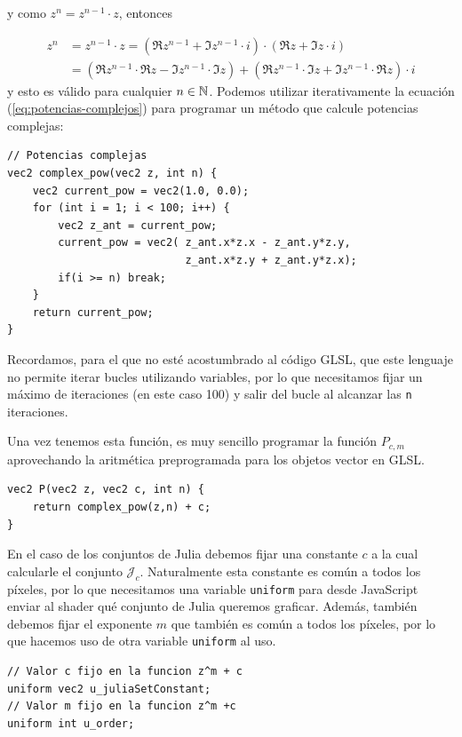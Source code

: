 y como $z^n = z^{n-1}\cdot z$, entonces

\begin{equation}
    \label{eq:potencias-complejos}
    \begin{split}
        z^n & = z^{n-1}\cdot z = (\Re z^{n-1} + \Im z^{n-1}\cdot i)\cdot(\Re z + \Im z\cdot i) \\
        & = \left(\Re z^{n-1}\cdot\Re z - \Im z^{n-1}\cdot \Im z\right) + \left(\Re z^{n-1}\cdot\Im z + \Im z^{n-1}\cdot\Re z\right)\cdot i 
    \end{split}
\end{equation}
y esto es válido para cualquier $n\in\mathbb{N}$. Podemos utilizar iterativamente la ecuación (\ref{eq:potencias-complejos}) para programar un método que calcule potencias complejas:
\begin{lstlisting}
// Potencias complejas
vec2 complex_pow(vec2 z, int n) {
    vec2 current_pow = vec2(1.0, 0.0);
    for (int i = 1; i < 100; i++) {
        vec2 z_ant = current_pow;
        current_pow = vec2( z_ant.x*z.x - z_ant.y*z.y, 
                            z_ant.x*z.y + z_ant.y*z.x);
        if(i >= n) break;
    }
    return current_pow;
}
\end{lstlisting}

Recordamos, para el que no esté acostumbrado al código GLSL, que este lenguaje no permite iterar bucles utilizando variables, por lo que necesitamos fijar un máximo de iteraciones (en este caso 100) y salir del bucle al alcanzar las \verb|n| iteraciones.

Una vez tenemos esta función, es muy sencillo programar la función $P_{c,m}$ aprovechando la aritmética preprogramada para los objetos vector en GLSL.

\begin{lstlisting}
vec2 P(vec2 z, vec2 c, int n) {
	return complex_pow(z,n) + c;
}
\end{lstlisting}

En el caso de los conjuntos de Julia debemos fijar una constante $c$ a la cual calcularle el conjunto $\mathcal{J}_c$. Naturalmente esta constante es común a todos los píxeles, por lo que necesitamos una variable \verb|uniform| para desde JavaScript enviar al shader qué conjunto de Julia queremos graficar. Además, también debemos fijar el exponente $m$ que también es común a todos los píxeles, por lo que hacemos uso de otra variable \verb|uniform| al uso.

\begin{lstlisting}
// Valor c fijo en la funcion z^m + c
uniform vec2 u_juliaSetConstant;
// Valor m fijo en la funcion z^m +c
uniform int u_order;
\end{lstlisting}

